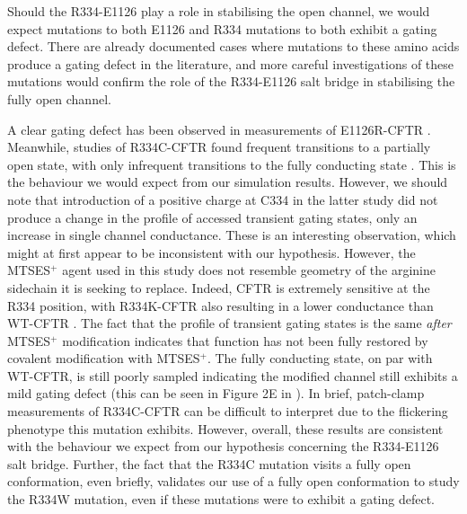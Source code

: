 Should the R334-E1126 play a role in stabilising the open channel, we would expect mutations to both E1126 and R334 mutations to both exhibit a gating defect. There are already documented cases where mutations to these amino acids produce a gating defect in the literature, and more careful investigations of these mutations would confirm the role of the R334-E1126 salt bridge in stabilising the fully open channel. 

A clear gating defect has been observed in measurements of E1126R-CFTR \cite{cui2014}. Meanwhile, studies of R334C-CFTR found frequent transitions to a partially open state, with only infrequent transitions to the fully conducting state \cite{zhang2005, zhang2005a}. This is the behaviour we would expect from our simulation results. However, we should note that introduction of a positive charge at C334 in the latter study did not produce a change in the profile of accessed transient gating states, only an increase in single channel conductance. These is an interesting observation, which might at first appear to be inconsistent with our hypothesis. However, the MTSES$^+$ agent used in this study does not resemble geometry of the arginine sidechain it is seeking to replace. Indeed, CFTR is extremely sensitive at the R334 position, with R334K-CFTR also resulting in a lower conductance than WT-CFTR \cite{gong2004}. The fact that the profile of transient gating states is the same \textit{after} MTSES$^+$ modification indicates that function has not been fully restored by covalent modification with  MTSES$^+$. The fully conducting state, on par with WT-CFTR, is still poorly sampled indicating the modified channel still exhibits a mild gating defect (this can be seen in Figure 2E in \cite{zhang2005}). In brief, patch-clamp measurements of R334C-CFTR can be difficult to interpret due to the flickering phenotype this mutation exhibits. However, overall, these results are consistent with the behaviour we expect from our hypothesis concerning the R334-E1126 salt bridge. Further, the fact that the R334C mutation visits a fully open conformation, even briefly, validates our use of a fully open conformation to study the R334W mutation, even if these mutations were to exhibit a gating defect.

